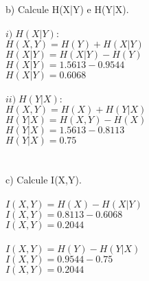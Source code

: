\documentclass[a4paper]{article}
\begin{document}
b) Calcule H(X|Y) e H(Y|X).      \\
\\
$ i) \; H(X|Y):                 $\\
$ H(X,Y) = H(Y) + H(X|Y)        $\\
$ H(X|Y) = H(X|Y) - H(Y)        $\\
$ H(X|Y) = 1.5613 - 0.9544      $\\
$ \boxed{ H(X|Y) = 0.6068 }     $\\
\\
$ ii) \; H(Y|X):                $\\
$ H(X,Y) = H(X) + H(Y|X)        $\\
$ H(Y|X) = H(X,Y) - H(X)        $\\
$ H(Y|X) = 1.5613 - 0.8113      $\\
$ \boxed{ H(Y|X) = 0.75 }       $\\
\\
\\
c) Calcule I(X,Y).               \\
\\
$ I(X,Y) = H(X) - H(X|Y)        $\\
$ I(X,Y) = 0.8113 - 0.6068      $\\
$ \boxed{ I(X,Y) = 0.2044 }     $\\
\\
$ I(X,Y) = H(Y) - H(Y|X)        $\\
$ I(X,Y) = 0.9544 - 0.75        $\\
$ \boxed{ I(X,Y) = 0.2044 }     $\\
\\
\\



%
\end{document}
